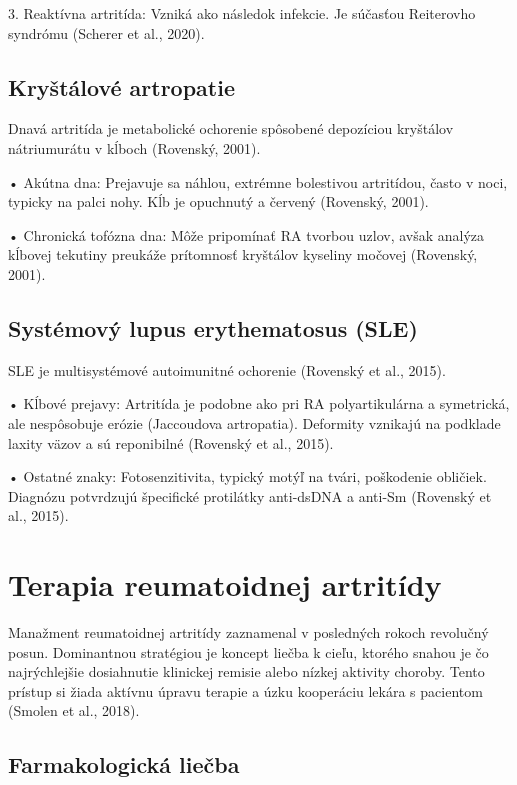 3. Reaktívna artritída: Vzniká ako následok infekcie. Je súčasťou Reiterovho syndrómu (Scherer et al., 2020). 

\subsection{Kryštálové artropatie}

Dnavá artritída je metabolické ochorenie spôsobené depozíciou kryštálov nátriumurátu v kĺboch (Rovenský, 2001). 

• Akútna dna: Prejavuje sa náhlou, extrémne bolestivou artritídou, často v noci, typicky na palci nohy. Kĺb je opuchnutý a červený (Rovenský, 2001). 

• Chronická tofózna dna: Môže pripomínať RA tvorbou uzlov, avšak analýza kĺbovej tekutiny preukáže prítomnosť kryštálov kyseliny močovej (Rovenský, 2001). 

\subsection{Systémový lupus erythematosus (SLE)}

SLE je multisystémové autoimunitné ochorenie (Rovenský et al., 2015). 

• Kĺbové prejavy: Artritída je podobne ako pri RA polyartikulárna a symetrická, ale nespôsobuje erózie (Jaccoudova artropatia). Deformity vznikajú na podklade laxity väzov a sú reponibilné (Rovenský et al., 2015). 

• Ostatné znaky: Fotosenzitivita, typický motýľ na tvári, poškodenie obličiek. Diagnózu potvrdzujú špecifické protilátky anti-dsDNA a anti-Sm (Rovenský et al., 2015). 

\section{Terapia reumatoidnej artritídy}

Manažment reumatoidnej artritídy zaznamenal v posledných rokoch revolučný posun. Dominantnou stratégiou je koncept liečba k cieľu, ktorého snahou je čo najrýchlejšie dosiahnutie klinickej remisie alebo nízkej aktivity choroby. Tento prístup si žiada aktívnu úpravu terapie a úzku kooperáciu lekára s pacientom (Smolen et al., 2018). 

\subsection{Farmakologická liečba}

